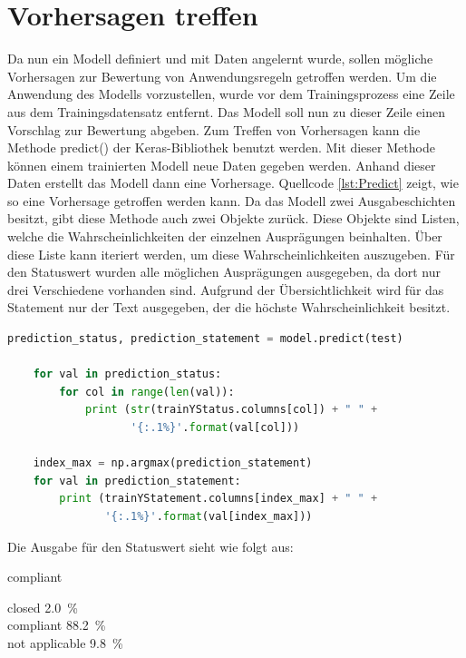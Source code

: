 \section{Vorhersagen treffen}
\label{chap:Prediction}

Da nun ein Modell definiert und mit Daten angelernt wurde, sollen mögliche Vorhersagen zur Bewertung von Anwendungsregeln getroffen werden. 
Um die Anwendung des Modells vorzustellen, wurde vor dem Trainingsprozess eine Zeile aus dem Trainingsdatensatz entfernt. 
Das Modell soll nun zu dieser Zeile einen Vorschlag zur Bewertung abgeben. Zum Treffen von Vorhersagen kann 
die Methode predict() der Keras-Bibliothek benutzt werden. Mit dieser Methode können einem trainierten Modell neue Daten gegeben werden.
Anhand dieser Daten erstellt das Modell dann eine Vorhersage. Quellcode \ref*{lst:Predict} zeigt, wie so eine Vorhersage getroffen werden kann.
Da das Modell zwei Ausgabeschichten besitzt, gibt diese Methode auch zwei Objekte zurück. Diese Objekte sind Listen, welche die Wahrscheinlichkeiten
der einzelnen Ausprägungen beinhalten. Über diese Liste kann iteriert werden, um diese Wahrscheinlichkeiten auszugeben. Für den Statuswert 
wurden alle möglichen Ausprägungen ausgegeben, da dort nur drei Verschiedene vorhanden sind. Aufgrund der Übersichtlichkeit wird für das Statement
nur der Text ausgegeben, der die höchste Wahrscheinlichkeit besitzt. 
\begin{lstlisting}[language = python, caption={Vorhersage über neue Daten treffen},captionpos=b, label = lst:Predict, floatplacement=H]
    prediction_status, prediction_statement = model.predict(test)

    for val in prediction_status:
        for col in range(len(val)):
            print (str(trainYStatus.columns[col]) + " " + 
                   '{:.1%}'.format(val[col]))
    
    index_max = np.argmax(prediction_statement)
    for val in prediction_statement:
        print (trainYStatement.columns[index_max] + " " + 
               '{:.1%}'.format(val[index_max]))
\end{lstlisting}
Die Ausgabe für den Statuswert sieht wie folgt aus:
\begin{description}[style=multiline,leftmargin=3cm,font=\bfseries, nolistsep]
    \item[Real]         compliant
    \item[Prediction]   closed 2.0~\%\\
                        compliant 88.2~\%\\
                        not applicable 9.8~\%
\end{description}
